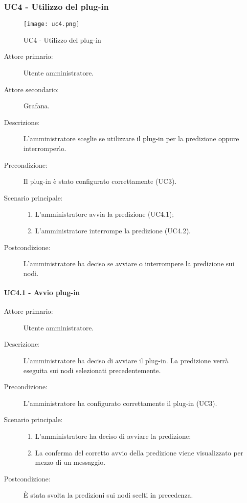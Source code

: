\subsubsection{UC4 - Utilizzo del plug-in}
\label{sssec:uc4}

\begin{figure}[h!]
  \begin{center}
    \texttt{[image: uc4.png]}\\
    \caption{UC4 - Utilizzo del plug-in}%
    \label{fig:uc4}
  \end{center}
  \end{figure}

\begin{description}
  \item[Attore primario:] Utente amministratore.
  \item[Attore secondario:] Grafana.
  \item[Descrizione:] L'amministratore sceglie se utilizzare il plug-in per la predizione oppure interromperlo.
  \item[Precondizione:] Il plug-in è stato configurato correttamente (UC3).
  \item[Scenario principale:]
  \begin{enumerate}
    \item L'amministratore avvia la predizione (UC4.1);
    \item L'amministratore interrompe la predizione (UC4.2).
  \end{enumerate}
  \item[Postcondizione:] L'amministratore ha deciso se avviare o interrompere la predizione sui nodi.
\end{description}

\paragraph{UC4.1 - Avvio plug-in}
\label{sssec:uc4.1}
\begin{description}
  \item[Attore primario:] Utente amministratore.
  \item[Descrizione:] L'amministratore ha deciso di avviare il plug-in. La predizione verrà eseguita sui nodi selezionati precedentemente.
  \item[Precondizione:] L'amministratore ha configurato correttamente il plug-in (UC3).
  \item[Scenario principale:]
  \begin{enumerate}
    \item L'amministratore ha deciso di avviare la predizione;
    \item La conferma del corretto avvio della predizione viene visualizzato per mezzo di un messaggio.
  \end{enumerate}
  \item[Postcondizione:] È stata svolta la predizioni sui nodi scelti in precedenza.
\end{description}

